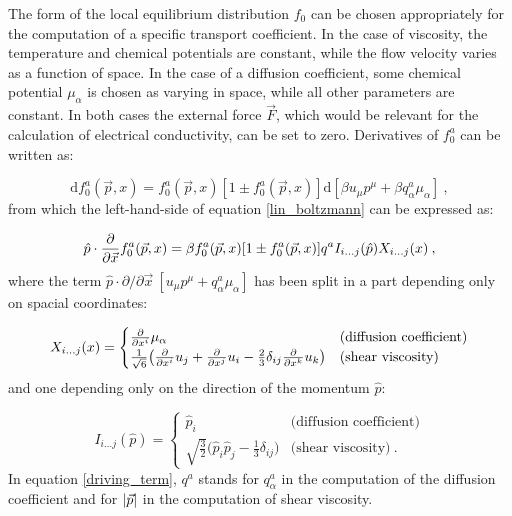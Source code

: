 The form of the local equilibrium distribution $f_0$ can be chosen appropriately for the computation of a specific transport coefficient. In the case of viscosity, the temperature and chemical potentials are constant, while the flow velocity varies as a function of space. In the case of a diffusion coefficient, some chemical potential $\mu_{\alpha}$ is chosen as varying in space, while all other parameters are constant. In both cases the external force $\vec F$, which would be relevant for the calculation of electrical conductivity, can be set to zero. Derivatives of $f_0^a$ can be written as:

\begin{equation}
\mathrm d f_0^a(\vec p,x) = f_0^a(\vec p,x) [1 \pm f_0^a(\vec p,x)] \mathrm d [\beta u_{\mu}p^{\mu} + \beta q^a_{\alpha} \mu_{\alpha}] \: ,
\end{equation}
%
from which the left-hand-side of equation \ref{lin_boltzmann} can be expressed as:

\begin{equation}
 \hat p \cdot \frac{\partial  }{\partial \vec x} f^a_0(\vec p, x) = \beta f_0^a(\vec p,x) [1 \pm f_0^a(\vec p,x)] q^a I_{i \dots j} (\hat p) X_{i \dots j} (x) \: ,
\label{driving_term}
\end{equation}
%
where the term $ \hat p \cdot \partial /\partial \vec x \: [u_{\mu}p^{\mu} + q^a_{\alpha} \mu_{\alpha}]$ has been split in a part depending only on spacial coordinates:

\begin{equation}
X_{i \dots j} (x) =
\begin{cases}
\frac{\partial  }{\partial x^i} \mu_{\alpha} & \mbox{(diffusion coefficient)} \\
\frac{1}{\sqrt 6} \bigl( \frac{\partial  }{\partial x^i} u_j + \frac{\partial  }{\partial x^j} u_i -\frac{2}{3} \delta_{ij} \frac{\partial  }{\partial x^k} u_k \bigr) & \mbox{(shear viscosity)}
\end{cases}
\end{equation}
%
and one depending only on the direction of the momentum $\hat p$:

\begin{equation}
I_{i \dots j} (\hat p)=
\begin{cases}
\hat p_i & \mbox{(diffusion coefficient)} \\
\sqrt{\frac{3}{2}} \bigl(\hat p_i \hat p_j - \frac{1}{3}\delta_{ij} \bigr) & \mbox{(shear viscosity)} \: .
\end{cases}
\end{equation}
%
In equation \ref{driving_term}, $q^a$ stands for $q^a_{\alpha}$ in the computation of the diffusion coefficient and for $\abs{\vec p}$ in the computation of shear viscosity.

